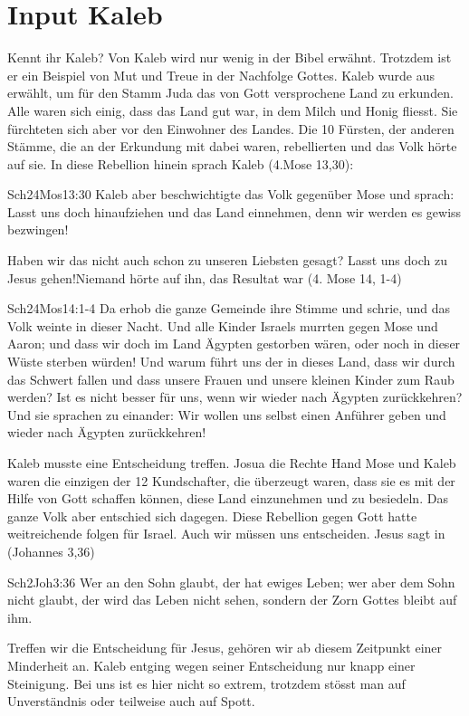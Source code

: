 \documentclass[12pt,a4paper]{scrarticle}
\begin{document}
\section{Input Kaleb}
Kennt ihr Kaleb?
Von Kaleb wird nur wenig in der Bibel erwähnt. Trotzdem ist er ein Beispiel von Mut und Treue in der Nachfolge Gottes. Kaleb wurde aus erwählt, um für den Stamm Juda das von Gott versprochene Land zu erkunden. Alle waren sich einig, dass das Land gut war, in dem Milch und Honig fliesst. Sie fürchteten sich aber vor den Einwohner des Landes. Die 10 Fürsten, der anderen Stämme, die an der Erkundung mit dabei waren, rebellierten und das Volk hörte auf sie. In diese Rebellion hinein sprach Kaleb (4.Mose 13,30):
\begin{bibeltext}{Sch2}{4Mos}{13:30}
Kaleb aber beschwichtigte das Volk gegenüber Mose und sprach: \glqq{}Lasst uns doch hinaufziehen und das Land einnehmen, denn wir werden es gewiss bezwingen!\grqq
\end{bibeltext}
Haben wir das nicht auch schon zu unseren Liebsten gesagt? \glqq{}Lasst uns doch zu Jesus gehen!\grqq Niemand hörte auf ihn, das Resultat war (4. Mose 14, 1-4)
\begin{bibeltext}{Sch2}{4Mos}{14:1-4}
Da erhob die ganze Gemeinde ihre Stimme und schrie, und das Volk weinte in dieser Nacht. Und alle Kinder Israels murrten gegen Mose und Aaron; und dass wir doch im Land Ägypten gestorben wären, oder noch in dieser Wüste sterben würden! Und warum führt uns der \herr{} in dieses Land, dass wir durch das Schwert fallen und dass unsere Frauen und unsere kleinen Kinder zum Raub werden? Ist es nicht besser für uns, wenn wir wieder nach Ägypten zurückkehren? Und sie sprachen zu einander: \glqq{}Wir wollen uns selbst einen Anführer geben und wieder nach Ägypten zurückkehren!\grqq
\end{bibeltext}
Kaleb musste eine Entscheidung treffen. Josua die Rechte Hand Mose und Kaleb waren die einzigen der 12 Kundschafter, die überzeugt waren, dass sie es mit der Hilfe von Gott schaffen können, diese Land einzunehmen und zu besiedeln. Das ganze Volk aber entschied sich dagegen. Diese Rebellion gegen Gott hatte weitreichende folgen für Israel.
Auch wir müssen uns entscheiden. Jesus sagt in (Johannes 3,36)
\begin{bibeltext}{Sch2}{Joh}{3:36}
Wer an den Sohn glaubt, der hat ewiges Leben; wer aber dem Sohn nicht glaubt, der wird das Leben nicht sehen, sondern der Zorn Gottes bleibt auf ihm.
\end{bibeltext}
Treffen wir die Entscheidung für Jesus, gehören wir ab diesem Zeitpunkt einer Minderheit an. Kaleb entging wegen seiner Entscheidung nur knapp einer Steinigung. Bei uns ist es hier nicht so extrem, trotzdem stösst man auf Unverständnis oder teilweise auch auf Spott.
\end{document}

